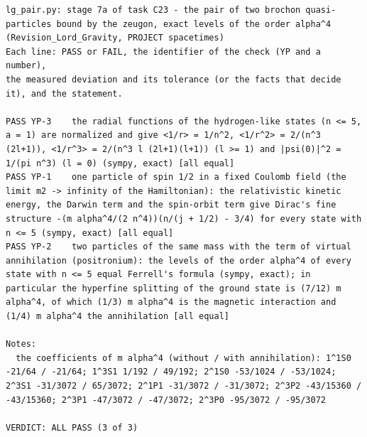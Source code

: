 \documentclass[
  10pt,
]{article}
\begin{document}
\begin{verbatim}
lg_pair.py: stage 7a of task C23 - the pair of two brochon quasi-particles bound by the zeugon, exact levels of the order alpha^4 (Revision_Lord_Gravity, PROJECT spacetimes)
Each line: PASS or FAIL, the identifier of the check (YP and a number),
the measured deviation and its tolerance (or the facts that decide it), and the statement.

PASS YP-3    the radial functions of the hydrogen-like states (n <= 5, a = 1) are normalized and give <1/r> = 1/n^2, <1/r^2> = 2/(n^3 (2l+1)), <1/r^3> = 2/(n^3 l (2l+1)(l+1)) (l >= 1) and |psi(0)|^2 = 1/(pi n^3) (l = 0) (sympy, exact) [all equal]
PASS YP-1    one particle of spin 1/2 in a fixed Coulomb field (the limit m2 -> infinity of the Hamiltonian): the relativistic kinetic energy, the Darwin term and the spin-orbit term give Dirac's fine structure -(m alpha^4/(2 n^4))(n/(j + 1/2) - 3/4) for every state with n <= 5 (sympy, exact) [all equal]
PASS YP-2    two particles of the same mass with the term of virtual annihilation (positronium): the levels of the order alpha^4 of every state with n <= 5 equal Ferrell's formula (sympy, exact); in particular the hyperfine splitting of the ground state is (7/12) m alpha^4, of which (1/3) m alpha^4 is the magnetic interaction and (1/4) m alpha^4 the annihilation [all equal]

Notes:
  the coefficients of m alpha^4 (without / with annihilation): 1^1S0 -21/64 / -21/64; 1^3S1 1/192 / 49/192; 2^1S0 -53/1024 / -53/1024; 2^3S1 -31/3072 / 65/3072; 2^1P1 -31/3072 / -31/3072; 2^3P2 -43/15360 / -43/15360; 2^3P1 -47/3072 / -47/3072; 2^3P0 -95/3072 / -95/3072

VERDICT: ALL PASS (3 of 3)
\end{verbatim}
\end{document}
